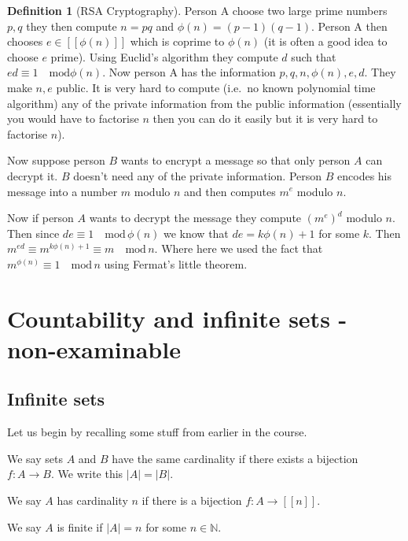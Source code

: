 \documentclass[
]{book}
\theoremstyle{definition}
\newtheorem{definition}{Definition}[chapter]
\theoremstyle{definition}
\theoremstyle{definition}
\theoremstyle{definition}
\theoremstyle{remark}
\begin{document}
\begin{definition}[RSA Cryptography]
Person A choose two large prime numbers \(p,q\) they then compute \(n=pq\) and \(\phi(n) = (p-1)(q-1)\). Person A then chooses \(e \in [[\phi(n)]]\) which is coprime to \(\phi(n)\) (it is often a good idea to choose \(e\) prime). Using Euclid's algorithm they compute \(d\) such that \(ed \equiv 1 \quad \mbox{mod} \phi(n)\). Now person A has the information \(p,q,n,\phi(n),e,d\). They make \(n,e\) public. It is very hard to compute (i.e.~no known polynomial time algorithm) any of the private information from the public information (essentially you would have to factorise \(n\) then you can do it easily but it is very hard to factorise \(n\)).

Now suppose person \(B\) wants to encrypt a message so that only person \(A\) can decrypt it. \(B\) doesn't need any of the private information. Person \(B\) encodes his message into a number \(m\) modulo \(n\) and then computes \(m^e\) modulo \(n\).

Now if person \(A\) wants to decrypt the message they compute \((m^e)^d\) modulo \(n\). Then since \(de \equiv 1 \quad \mbox{mod}\, \phi(n)\) we know that \(de = k\phi(n)+1\) for some \(k\). Then \(m^{ed} \equiv m^{k\phi(n)+1} \equiv m \quad \mbox{mod} \, n\). Where here we used the fact that \(m^{\phi(n)} \equiv 1 \quad \mbox{mod} \, n\) using Fermat's little theorem.
\end{definition}

\chapter{Countability and infinite sets - non-examinable}\label{countability-and-infinite-sets---non-examinable}

\section{Infinite sets}\label{infinite-sets}

Let us begin by recalling some stuff from earlier in the course.

We say sets \(A\) and \(B\) have the same cardinality if there exists a bijection \(f: A \rightarrow B\). We write this \(|A|=|B|\).

We say \(A\) has cardinality \(n\) if there is a bijection \(f: A \rightarrow [[n]]\).

We say \(A\) is finite if \(|A|=n\) for some \(n \in \mathbb{N}\).
\end{document}
